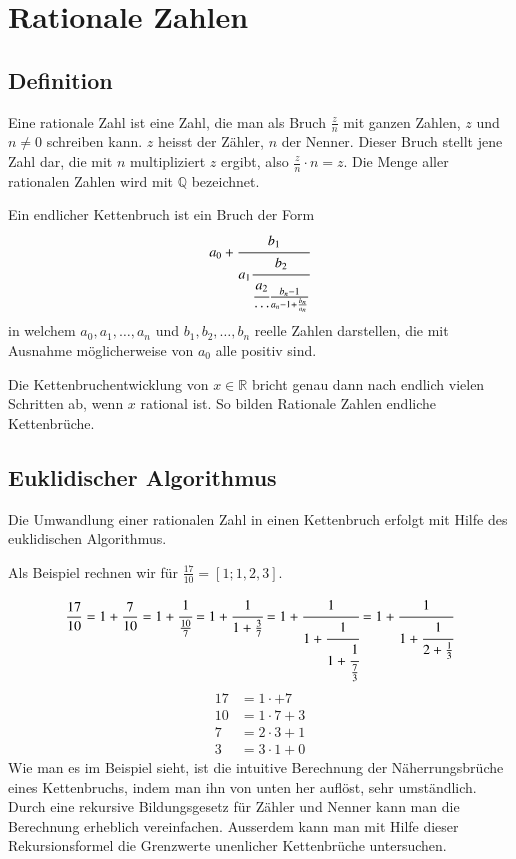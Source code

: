 %
%
%
\section{Rationale Zahlen
\label{kettenbruch:section:Zahlen}}
\subsection{Definition}
Eine rationale Zahl ist eine Zahl, die man als Bruch $\frac{z}{n}$ mit ganzen
Zahlen, $z$ und $n \ne 0$ schreiben kann. $z$ heisst der Zähler,
$n$ der Nenner. Dieser Bruch stellt jene Zahl dar, die mit $n$
multipliziert $z$ ergibt, also $\frac{z}{n} \cdot n = z$.
Die Menge aller rationalen Zahlen wird mit $\mathbb{Q}$ bezeichnet.

Ein endlicher Kettenbruch ist ein Bruch der Form
\begin{equation}
a_0 + \cfrac{b_1}{a_1\cfrac{b_2}{\cfrac{a_2}{\cdots}\frac{b_n-1}{a_n-1 + \frac{b_n}{a_n}}}}
\end{equation}
in welchem $a_0, a_1,\dots,a_n$ und $b_1,b_2,\dots,b_n$ reelle Zahlen
darstellen, die mit Ausnahme möglicherweise von $a_0$ alle positiv sind.

Die Kettenbruchentwicklung von $x \in \mathbb{R}$ bricht genau dann
nach endlich vielen Schritten ab, wenn $x$ rational ist. So bilden
Rationale Zahlen endliche Kettenbrüche.

\subsection{Euklidischer Algorithmus}
Die Umwandlung einer rationalen Zahl in einen Kettenbruch erfolgt
mit Hilfe des euklidischen Algorithmus.

Als Beispiel rechnen wir für $\frac{17}{10} = [1;1,2,3]$.

\begin{equation}
\frac{17}{10}
=
1 + \frac{7}{10}
=
1 + \cfrac{1}{\frac{10}{7}}
=
1 + \cfrac{1}{1+\frac{3}{7}}
=
1 + \cfrac{1}{1+\cfrac{1}{1+\cfrac{1}{\frac{7}{3}}}}
=
1 + \cfrac{1}{1+\cfrac{1}{2+\frac{1}{3}}}
\end{equation}
\begin{align*}
17 &= 1\cdot + 7 \\
10 &= 1\cdot 7 + 3 \\
7 &= 2\cdot 3 + 1 \\
3 &= 3\cdot 1 + 0
\end{align*}
Wie man es im Beispiel sieht, ist die intuitive Berechnung der
Näherrungsbrüche eines Kettenbruchs, indem man ihn von unten her
auflöst, sehr umständlich. Durch eine rekursive Bildungsgesetz für
Zähler und Nenner kann man die Berechnung erheblich vereinfachen.
Ausserdem kann man mit Hilfe dieser Rekursionsformel die Grenzwerte
unenlicher Kettenbrüche untersuchen.

